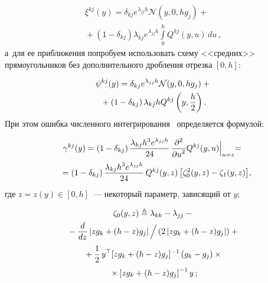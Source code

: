 \begin{multicols}{2}
 \noindent
 \begin{multline*} %
 \xi^{kj}(y)=\delta_{kj}e^{\lambda_{jj}h}\mathcal{N}(y,0,hg_j)+{}\\
 {}+
 \left(1-\delta_{kj}\right)\lambda_{kj}e^{\lambda_{jj}h}
 \int\limits_0^h Q^{kj}(y,u)\,du\,,
 \end{multline*}
 а~для ее приближения попробуем использовать схему <<средних>> 
прямоугольников без дополнительного дробления отрезка $[0,h]$:

\noindent
 \begin{multline*} %
 \psi^{kj}(y)=\delta_{kj}e^{\lambda_{jj}h}\mathcal{N}(y,0,hg_j)
+{}\\
{}+
 \left(1-\delta_{kj}\right)\lambda_{kj}hQ^{kj}\left(y,\fr{h}{2}\right).
 \end{multline*}
 При этом ошибка численного интегрирования~\cite{IK_94} определяется 
формулой:

\noindent
 \begin{multline*} %
 \gamma^{kj}(y)=\left(1-
\delta_{kj}\right)\fr{\lambda_{kj}h^3e^{\lambda_{jj}h}}{24}\,
\fr{\partial^2}{\partial u^2}Q^{kj}(y,u)\Bigl|_{u=z} ={}\\
\hspace*{-2pt}{}=
 \left(1-\delta_{kj}\right)\fr{\lambda_{kj}h^3e^{\lambda_{jj}h}}{24}
 \,Q^{kj}(y,z) \left[\zeta_0^2(y,z)-\zeta_1(y,z)\right]\!,\hspace*{-7.95522pt}
 \end{multline*}
 где $z = z (y) \in [0,h]$~--- некоторый параметр, зависящий от $y$;
 
\noindent
 \begin{multline*} %
 \zeta_0 (y,z) \triangleq
 \lambda_{kk}-\lambda_{jj}-{}\\
 {}-\fr{d}{dz}\left\vert z g_k+(h-z)g_j\right\vert \Big/
 \left(2\left\vert z g_k+(h-
z)g_j \right\vert\right)
 +{}\\
{} +\fr{1}{2}\,y^{\top}[z g_k+(h-z)g_j]^{-1}\left( g_k-g_j\right)\times{}\\
{}\times\left[z 
g_k+(h-z)g_j\right]^{-1}y\,;
 \end{multline*}

\vspace{-16pt}


\end{multicols}
